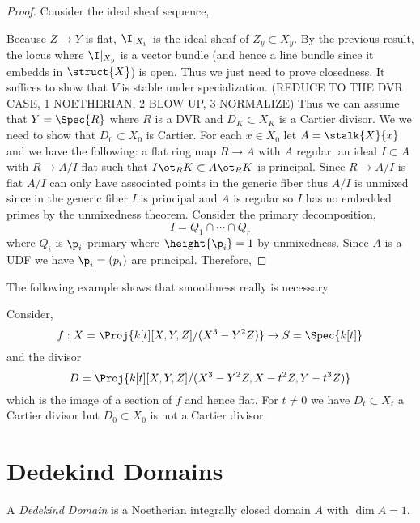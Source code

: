 \documentclass[12pt]{article}
\begin{document}
\begin{proof}
Consider the ideal sheaf sequence,
\begin{center}
\end{center}
Because $Z \to Y$ is flat, $\I|_{X_y}$ is the ideal sheaf of $Z_y \subset X_y$. By the previous result, the locus where $\I|_{X_y}$ is a vector bundle (and hence a line bundle since it embedds in $\struct{X}$) is open. Thus we just need to prove closedness. It suffices to show that $V$ is stable under specialization. 
(REDUCE TO THE DVR CASE, 1 NOETHERIAN, 2 BLOW UP, 3 NORMALIZE)
Thus we can assume that $Y = \Spec{R}$ where $R$ is a DVR and $D_K \subset X_K$ is a Cartier divisor. We we need to show that $D_0 \subset X_0$ is Cartier. For each $x \in X_0$ let $A = \stalk{X}{x}$ and we have the following: a flat ring map $R \to A$ with $A$ regular, an ideal $I \subset A$ with $R \to A/I$ flat such that $I \ot_R K \subset A \ot_R K$ is principal. Since $R \to A/I$ is flat $A/I$ can only have associated  points in the generic fiber thus $A/I$ is unmixed since in the generic fiber $I$ is principal and $A$ is regular so $I$ has no embedded primes by the unmixedness theorem. Consider the primary decomposition, 
\[ I = Q_1 \cap \cdots \cap Q_r \]
where $Q_i$ is $\p_i$-primary where $\height{\p_i} = 1$ by unmixedness. Since $A$ is a UDF we have $\p_i = (p_i)$ are principal. Therefore, 
\end{proof}

\begin{rmk}
The following example shows that smoothness really is necessary. 
\end{rmk}

\begin{example}
Consider,
\[ f : X = \Proj{k[t][X,Y,Z]/(X^3-Y^2Z)} \to S = \Spec{k[t]} \]
and the divisor
\[ D = \Proj{k[t][X,Y,Z]/(X^3 - Y^2 Z, X - t^2 Z, Y - t^3 Z)} \]
which is the image of a section of $f$ and hence flat. For $t \neq 0$ we have $D_t \subset X_t$ a Cartier divisor but $D_0 \subset X_0$ is not a Cartier divisor. 
\end{example}

\section{Dedekind Domains}

\begin{defn}
A \textit{Dedekind Domain} is a Noetherian integrally closed domain $A$ with $\dim{A} = 1$.
\end{defn}
\end{document}
